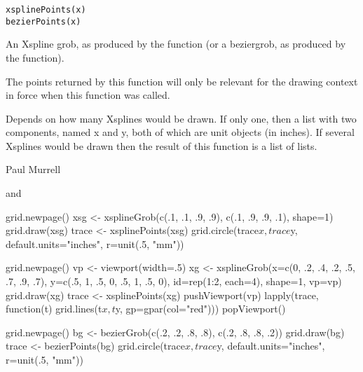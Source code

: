 %
\begin{Usage}
\begin{verbatim}
xsplinePoints(x)
bezierPoints(x)
\end{verbatim}
\end{Usage}
%
\begin{Arguments}
\begin{ldescription}
\item[\code{x}] 
An Xspline grob, as produced by the  function
(or a beziergrob, as produced by the  function).

\end{ldescription}
\end{Arguments}
%
\begin{Details}\relax
The points returned by this function will only be relevant
for the drawing context in force when this function was called.
\end{Details}
%
\begin{Value}
Depends on how many Xsplines would be drawn.  If only one, then
a list with two components, named x and y, both of which are
unit objects (in inches).  If several Xsplines would be drawn
then the result of this function is a list of lists.
\end{Value}
%
\begin{Author}\relax
Paul Murrell
\end{Author}
%
\begin{SeeAlso}\relax
{} and
\end{SeeAlso}
%
\begin{Examples}
\begin{ExampleCode}
grid.newpage()
xsg <- xsplineGrob(c(.1, .1, .9, .9), c(.1, .9, .9, .1), shape=1)
grid.draw(xsg)
trace <- xsplinePoints(xsg)
grid.circle(trace$x, trace$y, default.units="inches", r=unit(.5, "mm"))

grid.newpage()
vp <- viewport(width=.5)
xg <- xsplineGrob(x=c(0, .2, .4, .2, .5, .7, .9, .7),
                  y=c(.5, 1, .5, 0, .5, 1, .5, 0),
                  id=rep(1:2, each=4),
                  shape=1,
                  vp=vp)
grid.draw(xg)
trace <- xsplinePoints(xg)
pushViewport(vp)
lapply(trace, function(t) grid.lines(t$x, t$y, gp=gpar(col="red")))
popViewport()

grid.newpage()
bg <- bezierGrob(c(.2, .2, .8, .8), c(.2, .8, .8, .2))
grid.draw(bg)
trace <- bezierPoints(bg)
grid.circle(trace$x, trace$y, default.units="inches", r=unit(.5, "mm"))
\end{ExampleCode}
\end{Examples}
\clearpage
